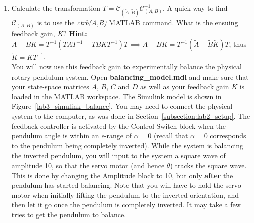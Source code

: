 \begin{enumerate}
\begin{enumerate}
              \item Calculate the transformation $T=\mathcal{C}_{(\tilde{A},\tilde{B})} \mathcal{C}_{(A,B)}^{-1}$. A quick way to find $\mathcal{C}_{(A,B)}$ is to use the \emph{ctrb(A,B)} MATLAB command. What is the ensuing feedback gain, $K$?
                    \textbf{Hint:} $A-BK= T^{-1}(TAT^{-1} - TBKT^{-1})T \implies A-BK = T^{-1}(\tilde{A}-\tilde{B}\tilde{K})T$, thus $\tilde{K}=KT^{-1}$.\\

                    You will now use this feedback gain to experimentally balance the physical rotary pendulum system. Open \textbf{balancing\_model.mdl} and make sure that your state-space matrices $A$, $B$, $C$ and $D$ as well as your feedback gain $K$ is loaded in the MATLAB workspace. The Simulink model is shown in Figure~\ref{lab3_simulink_balance}. You may need to connect the physical system to the computer, as was done in Section~\ref{subsection:lab2_setup}. The feedback controller is activated by the Control Switch block when the pendulum angle is within an $\epsilon$-range of $\alpha = 0$ (recall that $\alpha=0$ corresponds to the pendulum being completely inverted). While the system is balancing the inverted pendulum, you will input to the system a square wave of amplitude 10, so that the servo motor (and hence $\theta$) tracks the square wave. This is done by changing the Amplitude block to 10, but only \textbf{after} the pendulum has started balancing. Note that you will have to hold the servo motor when initially lifting the pendulum to the inverted orientation, and then let it go once the pendulum is completely inverted. It may take a few tries to get the pendulum to balance.


\end{enumerate}
\end{enumerate}
